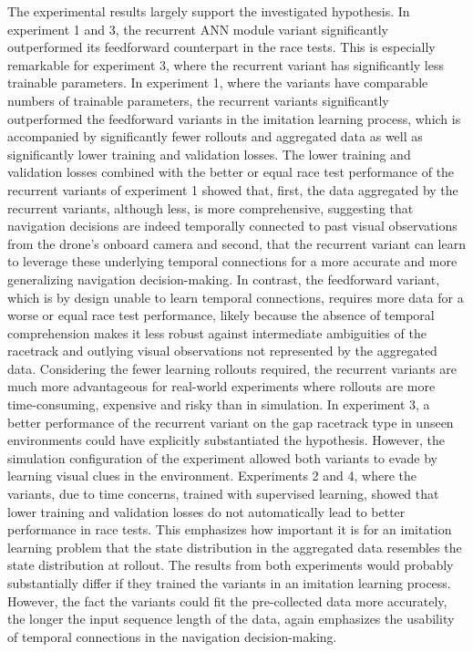 The experimental results largely support the investigated hypothesis. 
In experiment 1 and 3, the recurrent ANN module variant significantly outperformed 
its feedforward counterpart in the race tests. This is especially remarkable for experiment 3, 
where the recurrent variant has significantly less trainable parameters. 
In experiment 1, where the variants have comparable numbers of trainable parameters, 
the recurrent variants significantly outperformed the feedforward variants in the imitation learning process, 
which is accompanied by significantly fewer rollouts and aggregated data as well as significantly lower training 
and validation losses. The lower training and validation losses combined with the better or equal race test performance 
of the recurrent variants of experiment 1 showed that, first, the data aggregated by the recurrent variants, 
although less, is more comprehensive, suggesting that navigation decisions are indeed temporally connected to past 
visual observations from the drone's onboard camera and second, that the recurrent variant can learn to 
leverage these underlying temporal connections for a more accurate and more generalizing navigation decision-making. 
In contrast, the feedforward variant, which is by design unable to learn temporal connections, 
requires more data for a worse or equal race test performance, likely because the absence of temporal comprehension 
makes it less robust against intermediate ambiguities of the racetrack and outlying visual observations not 
represented by the aggregated data. Considering the fewer learning rollouts required, the recurrent variants 
are much more advantageous for real-world experiments where rollouts are more time-consuming, expensive and 
risky than in simulation. In experiment 3, a better performance of the recurrent variant on the gap racetrack 
type in unseen environments could have explicitly substantiated the hypothesis. However, the simulation 
configuration of the experiment allowed both variants to evade by learning visual clues in the environment. 
Experiments 2 and 4, where the variants, due to time concerns, trained with supervised learning, showed that 
lower training and validation losses do not automatically lead to better performance in race tests. 
This emphasizes how important it is for an imitation learning problem that the state distribution in the 
aggregated data resembles the state distribution at rollout. The results from both experiments would probably 
substantially differ if they trained the variants in an imitation learning process. However, 
the fact the variants could fit the pre-collected data more accurately, the longer the input sequence length 
of the data, again emphasizes the usability of temporal connections in the navigation decision-making. 


